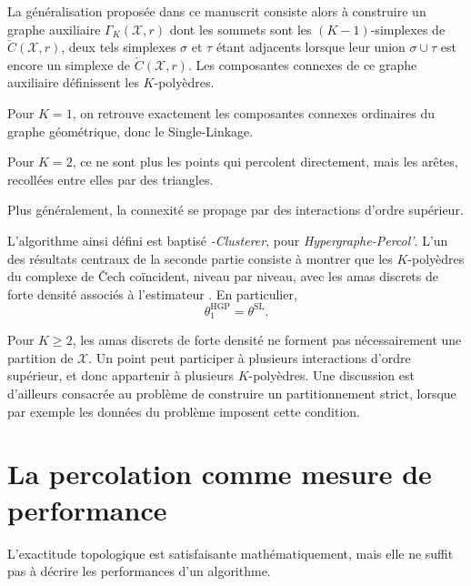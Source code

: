 La généralisation proposée dans ce manuscrit consiste alors à construire un graphe auxiliaire $\Gamma_K(\mathcal X,r)$ dont les sommets sont les $(K-1)$-simplexes de $\check{C}(\mathcal X,r)$, deux tels simplexes $\sigma$ et $\tau$ étant adjacents lorsque leur union $\sigma\cup\tau$ est encore un simplexe de $\check{C}(\mathcal X,r)$. 
Les composantes connexes de ce graphe auxiliaire définissent les $K$-polyèdres.

Pour $K=1$, on retrouve exactement les composantes connexes ordinaires du graphe géométrique, donc le Single-Linkage. 

Pour $K=2$, ce ne sont plus les points qui percolent directement, mais les arêtes, recollées entre elles par des triangles.

Plus généralement, la connexité se propage par des interactions d'ordre supérieur.

L'algorithme ainsi défini est baptisé \emph{\HGP-Clusterer}, pour
\emph{Hypergraphe-Percol'}.
L'un des résultats centraux de la seconde partie 
consiste à montrer que les $K$-polyèdres du complexe de \v{C}ech coïncident, niveau par
niveau, avec les amas discrets de forte densité associés à l'estimateur \KNN.
En particulier,
\[
    \theta^{\mathrm{HGP}}_1 = \theta^{\mathrm{SL}}.
\]


Pour $K\geq2$, les amas discrets de forte densité ne forment pas nécessairement une partition de $\mathcal X$. Un point peut participer à plusieurs interactions d'ordre supérieur, et donc appartenir à plusieurs $K$-polyèdres. 
Une discussion est d'ailleurs consacrée au problème de construire un partitionnement strict, lorsque par exemple les données du problème imposent cette condition. %

\section{La percolation comme mesure de performance}

L'exactitude topologique est satisfaisante mathématiquement, mais elle ne suffit pas à décrire les performances d'un algorithme. 

